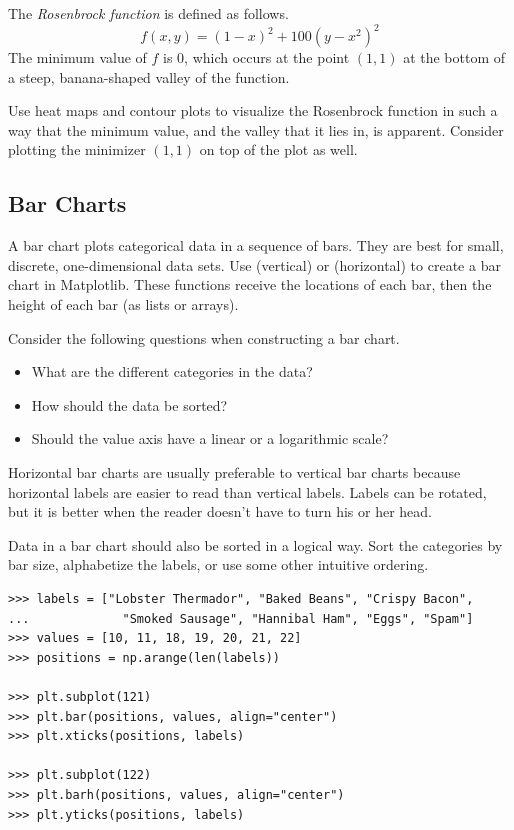\begin{problem} %
The \emph{Rosenbrock function} is defined as follows.
\[f(x,y) = (1-x)^2 + 100(y-x^2)^2\]
The minimum value of $f$ is $0$, which occurs at the point $(1,1)$ at the bottom of a steep, banana-shaped valley of the function.

Use heat maps and contour plots to visualize the Rosenbrock function in such a way that the minimum value, and the valley that it lies in, is apparent.
Consider plotting the minimizer $(1,1)$ on top of the plot as well.
\end{problem}

\subsection*{Bar Charts} %

A bar chart plots categorical data in a sequence of bars.
They are best for small, discrete, one-dimensional data sets.
Use  (vertical) or  (horizontal) to create a bar chart in Matplotlib.
These functions receive the locations of each bar, then the height of each bar (as lists or arrays).

Consider the following questions when constructing a bar chart.

\begin{itemize}
    \item What are the different categories in the data?
    \item How should the data be sorted?
    \item Should the value axis have a linear or a logarithmic scale?
\end{itemize}

Horizontal bar charts are usually preferable to vertical bar charts because horizontal labels are easier to read than vertical labels.
Labels can be rotated, but it is better when the reader doesn't have to turn his or her head.

Data in a bar chart should also be sorted in a logical way.
Sort the categories by bar size, alphabetize the labels, or use some other intuitive ordering.

\begin{lstlisting}
>>> labels = ["Lobster Thermador", "Baked Beans", "Crispy Bacon",
...             "Smoked Sausage", "Hannibal Ham", "Eggs", "Spam"]
>>> values = [10, 11, 18, 19, 20, 21, 22]
>>> positions = np.arange(len(labels))

>>> plt.subplot(121)
>>> plt.bar(positions, values, align="center")
>>> plt.xticks(positions, labels)

>>> plt.subplot(122)
>>> plt.barh(positions, values, align="center")
>>> plt.yticks(positions, labels)
\end{lstlisting}

